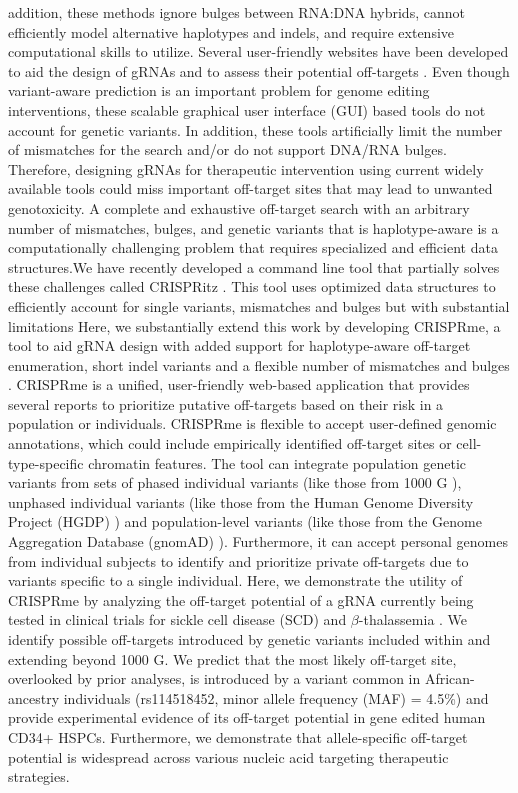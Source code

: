 \documentclass[a4paper, titlepage, openright]{book}
\newcommand{\crisprme}{CRISPRme\xspace}
\begin{document}
addition, these methods ignore bulges between RNA:DNA hybrids, cannot efficiently model alternative haplotypes and indels, and require extensive computational skills to utilize. Several user-friendly websites have been developed to aid the design of gRNAs and to assess their potential off-targets \citep{concordet2018crispor, listgarten2018prediction, labun2019chopchop, park2015cas}. Even though variant-aware prediction is an important problem for genome editing interventions, these scalable graphical user interface (GUI) based tools do not account for genetic variants. In addition, these tools artificially limit the number of mismatches for the search and/or do not support DNA/RNA bulges. Therefore, designing gRNAs for therapeutic intervention using current widely available tools could miss important off-target sites that may lead to unwanted genotoxicity. A complete and exhaustive off-target search with an arbitrary number of mismatches, bulges, and genetic variants that is haplotype-aware is a computationally challenging problem that requires specialized and efficient data structures.We have recently developed a command line tool that partially solves these challenges called CRISPRitz \citep{cancellieri2020crispritz}. This tool uses optimized data structures to efficiently account for single variants, mismatches and bulges but with substantial limitations Here, we substantially extend this work by developing \crisprme, a tool to aid gRNA design with added support for haplotype-aware off-target enumeration, short indel variants and a flexible number of mismatches and bulges \citep{cancellieri2023human}. \crisprme is a unified, user-friendly web-based application that provides several reports to prioritize putative off-targets based on their risk in a population or individuals. \crisprme is flexible to accept user-defined genomic annotations, which could include empirically identified off-target sites or cell-type-specific chromatin features. The tool can integrate population genetic variants from sets of phased individual variants (like those from 1000 G \citep{lowy2019variant}), unphased individual variants (like those from the Human Genome Diversity Project (HGDP) \citep{bergstrom2020insights}) and population-level variants (like those from the Genome Aggregation Database (gnomAD) \citep{karczewski2020mutational}).  Furthermore, it can accept personal genomes from individual subjects to identify and prioritize private off-targets due to variants specific to a single individual. Here, we demonstrate the utility of \crisprme by analyzing the off-target potential of a gRNA currently being tested in clinical trials for sickle cell disease (SCD) and $\beta$-thalassemia \citep{frangoul2021crispr, canver2015bcl11a, wu2019highly}. We identify possible off-targets introduced by genetic variants included within and extending beyond 1000 G. We predict that the most likely off-target site, overlooked by prior analyses, is introduced by a variant common in African-ancestry individuals (rs114518452, minor allele frequency (MAF) = 4.5\%) and provide experimental evidence of its off-target potential in gene edited human CD34+ HSPCs. Furthermore, we demonstrate that allele-specific off-target potential is widespread across various nucleic acid targeting therapeutic strategies.
\end{document}

